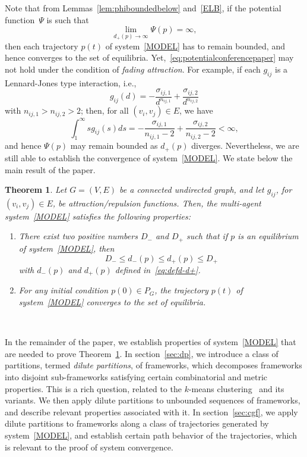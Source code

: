 \documentclass[10pt,twocolumn,twoside]{IEEEtran}
\newtheorem{theorem}{Theorem}
\renewcommand{\(}{\left (}
\renewcommand{\)}{\right )}
\renewcommand{\;}{\,;\,}
\begin{document}
Note that from Lemmas~\ref{lem:phiboundedbelow} and~\ref{ELB}, if the potential function~$\Psi$ is such that
\begin{equation}\label{eq:potentialconferencepaper}
\lim_{d_+(p) \to \infty} \Psi(p) = \infty, 
\end{equation}
then each trajectory $p(t)$ of system~\eqref{MODEL} has to remain bounded, and hence converges to the {set of  equilibria}.  Yet,~\eqref{eq:potentialconferencepaper} may not hold under the condition of {\it fading attraction}. For example, if each $g_{ij}$ is a Lennard-Jones type interaction, i.e.,
$$
g_{ij}(d) = - \frac{\sigma_{ij,1}}{d^{n_{ij,1}}} + \frac{\sigma_{ij,2}}{d^{n_{ij,2}}} 
$$
with $n_{ij,1} > n_{ij,2} > 2$; then,  for all $(v_i,v_j) \in E$, we have
$$
\int^{\infty}_{1} sg_{ij}(s)ds = -\frac{\sigma_{ij,1}}{n_{ij,1} - 2} + \frac{\sigma_{ij,2}}{n_{ij,2} - 2} < \infty, 
$$
and hence $\Psi(p)$ may remain bounded as $d_+(p)$ diverges. Nevertheless, we are still able to establish the convergence of system~\eqref{MODEL}. 
We state below  the main result of the paper. 



\begin{theorem}\label{thm:MAIN}
Let $G = (V, E)$ be a connected undirected graph, and let $g_{ij}$, for $(v_i,v_j) \in E$,  be attraction/repulsion functions. Then, the multi-agent system~\eqref{MODEL} satisfies the following properties:
\begin{enumerate}
\item There exist two positive numbers $D_-$ and $D_+$ such that if $p$ is an equilibrium of system~\eqref{MODEL}, then 
$$
D_- \le d_-(p) \le d_+(p) \le D_+
$$
with $d_-(p)$ and $d_+(p)$ defined in~\eqref{eq:defd-d+}.
\item For any initial condition $p(0)\in P_G$, the trajectory $p(t)$ of system~\eqref{MODEL} converges to the set of equilibria. 
\end{enumerate}\, 
\end{theorem}




In the remainder of the paper, we establish properties of system~\eqref{MODEL} that are needed to prove Theorem~\ref{thm:MAIN}. 
In section~\ref{sec:dp}, we introduce a class of partitions, termed {\it dilute partitions}, of frameworks, which decomposes frameworks into disjoint sub-frameworks satisfying certain 
combinatorial and metric properties. This is a rich question, related to the $k$-means clustering~\cite{macqueen1967some} and its variants.  We then apply dilute partitions to unbounded sequences of frameworks,  and describe relevant properties associated with it. 
 In section~\ref{sec:cgf}, we apply dilute partitions to frameworks  along a class of trajectories generated by system~\eqref{MODEL}, and establish certain path behavior of the trajectories, which is relevant to the proof of system convergence.  
\end{document}
